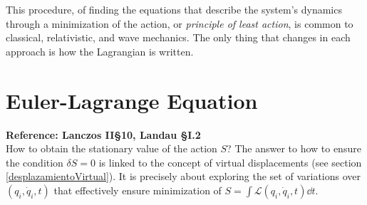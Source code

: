 \documentclass[12pt, english, a4paper]{article}
\begin{document}
This procedure, of finding the equations that describe the system's dynamics through a minimization of the action, or \emph{principle of least action}, is common to classical, relativistic, and wave mechanics.
The only thing that changes in each approach is how the Lagrangian is written.

\section{Euler-Lagrange Equation}\label{EulerLagrange} %
\textbf{Reference: Lanczos II\S10, Landau \S I.2}\\

How to obtain the stationary value of the action \(S\)?
The answer to how to ensure the condition \(\delta S= 0\) is linked to the concept of virtual displacements (see section \ref{desplazamientoVirtual}).
It is precisely about exploring the set of variations over \((q_i, \dot{q}_i, t)\) that effectively ensure minimization of \(S= \int \mathcal{L}(q_i, \dot{q}_i, t) \dd t\).
\end{document}
